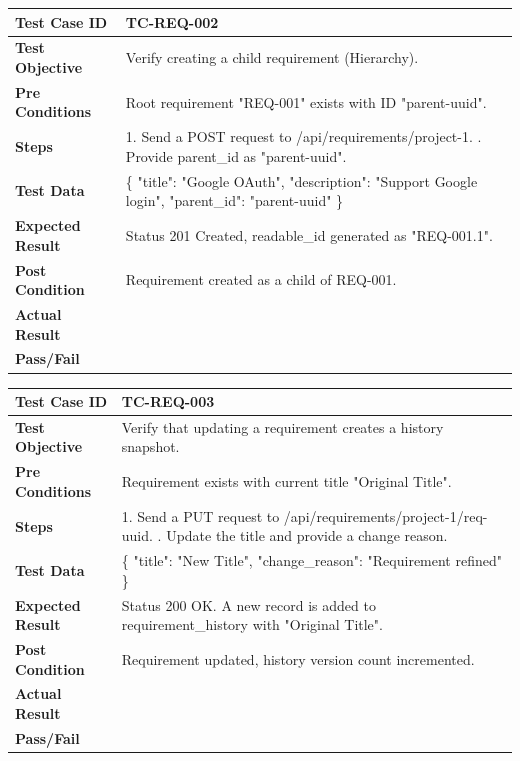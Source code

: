 \begin{longtable}{|p{}|p{}|}
\hline
\textbf{Test Case ID} & TC-REQ-002 \\ \hline
\textbf{Test Objective} & Verify creating a child requirement (Hierarchy). \\ \hline
\textbf{Pre Conditions} & Root requirement "REQ-001" exists with ID "parent-uuid". \\ \hline
\textbf{Steps} & 
1. Send a POST request to /api/requirements/project-1. \newline
2. Provide parent\_id as "parent-uuid". \\ \hline
\textbf{Test Data} & \{ "title": "Google OAuth", "description": "Support Google login", "parent\_id": "parent-uuid" \} \\ \hline
\textbf{Expected Result} & Status 201 Created, readable\_id generated as "REQ-001.1". \\ \hline
\textbf{Post Condition} & Requirement created as a child of REQ-001. \\ \hline
\textbf{Actual Result} &  \\ \hline
\textbf{Pass/Fail} &  \\ \hline
\end{longtable}

\begin{longtable}{|p{}|p{}|}
\hline
\textbf{Test Case ID} & TC-REQ-003 \\ \hline
\textbf{Test Objective} & Verify that updating a requirement creates a history snapshot. \\ \hline
\textbf{Pre Conditions} & Requirement exists with current title "Original Title". \\ \hline
\textbf{Steps} & 
1. Send a PUT request to /api/requirements/project-1/req-uuid. \newline
2. Update the title and provide a change reason. \\ \hline
\textbf{Test Data} & \{ "title": "New Title", "change\_reason": "Requirement refined" \} \\ \hline
\textbf{Expected Result} & Status 200 OK. A new record is added to requirement\_history with "Original Title". \\ \hline
\textbf{Post Condition} & Requirement updated, history version count incremented. \\ \hline
\textbf{Actual Result} &  \\ \hline
\textbf{Pass/Fail} &  \\ \hline
\end{longtable}

